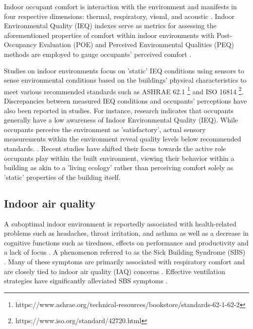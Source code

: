Indoor occupant comfort is interaction with the environment and manifests in four respective dimensions: thermal, respiratory, visual, and acoustic \cite{alavi_comfort_2017}. Indoor Environmental Quality (IEQ) \cite{kulshreshtha_indoor_2024} indexes serve as metrics for assessing the aforementioned properties of comfort within indoor environments with Post-Occupancy Evaluation (POE) \cite{elsayed_post-occupancy_2023} and Perceived Environmental Qualities (PEQ) \cite{son_perceived_2023} methods are employed to gauge occupants' perceived comfort \cite{boissonneault_concepts_2023}. 

Studies on indoor environments focus on 'static' IEQ conditions using sensors to sense environmental conditions based on the buildings' physical characteristics to meet various recommended standards such as ASHRAE 62.1 \footnote{https://www.ashrae.org/technical-resources/bookstore/standards-62-1-62-2} and ISO 16814 \footnote{https://www.iso.org/standard/42720.html}. Discrepancies between measured IEQ conditions and occupants' perceptions have also been reported in studies. For instance, research indicates that occupants generally have a low awareness of Indoor Environmental Quality (IEQ). While occupants perceive the environment as 'satisfactory', actual sensory measurements within the environment reveal quality levels below recommended standards. \cite{son_perceived_2023}. Recent studies have shifted their focus towards the active role occupants play within the built environment, viewing their behavior within a building as akin to a 'living ecology' \cite{langevin_quantifying_2016} rather than perceiving comfort solely as 'static' properties of the building itself. 


\subsection{Indoor air quality}
\label{sec:iaq}

A suboptimal indoor environment is reportedly associated with health-related problems such as headaches, throat irritation, and asthma \cite{klepeis_national_2001} as well as a decrease in cognitive functions such as tiredness, effects on performance and productivity and a lack of focus \cite{wang_how_2021} \cite{du_indoor_2020}. A phenomenon referred to as the Sick Building Syndrome (SBS) \cite{gawande_indoor_2020, passarelli_sick_2009}. Many of these symptoms are primarily associated with respiratory comfort and are closely tied to indoor air quality (IAQ) concerns \cite{kim_analyzing_2019}. Effective ventilation strategies
have significantly alleviated SBS symptoms \cite{gawande_indoor_2020}.

